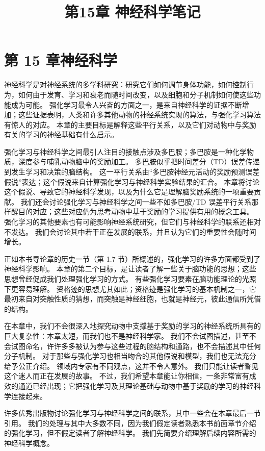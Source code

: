 \documentclass[UTF8,12pt,a4paper,fontset=fandol]{ctexart}
\title{第15章 神经科学笔记}
\author{}
\date{}
\begin{document}
\maketitle

\section*{第 15 章\quad 神经科学}

神经科学是对神经系统的多学科研究：研究它们如何调节身体功能，如何控制行为，如何由于发育、学习和衰老而随时间改变，以及细胞和分子机制如何使这些功能成为可能。
强化学习最令人兴奋的方面之一，是来自神经科学的证据不断增加；这些证据表明，人类和许多其他动物的神经系统实现的算法，与强化学习算法有惊人的对应。
本章的主要目标是解释这些平行关系，以及它们对动物中与奖励有关的学习的神经基础有什么启示。

强化学习与神经科学之间最引人注目的接触点涉及多巴胺；多巴胺是一种化学物质，深度参与哺乳动物脑中的奖励加工。
多巴胺似乎把时间差分（TD）误差传递到发生学习和决策的脑结构。
这一平行关系由“多巴胺神经元活动的奖励预测误差假说”表达；这个假说来自计算强化学习与神经科学实验结果的汇合。
本章将讨论这个假说、导致它的神经科学发现，以及为什么它是理解脑奖励系统的一项重要贡献。
我们还会讨论强化学习与神经科学之间一些不如多巴胺/TD 误差平行关系那样醒目的对应；这些对应仍为思考动物中基于奖励的学习提供有用的概念工具。
强化学习的其他要素也有可能影响神经系统研究，但它们与神经科学的联系还相对不发达。
我们会讨论其中若干正在发展的联系，并且认为它们的重要性会随时间增长。

正如本书导论章的历史一节（第 1.7 节）所概述的，强化学习的许多方面都受到了神经科学影响。
本章的第二个目标，是让读者了解一些关于脑功能的思想；这些思想曾经促成我们处理强化学习的方式。
有些强化学习要素在脑功能理论的光照下更容易理解。
资格迹的思想尤其如此；资格迹是强化学习的基本机制之一，它最初来自对突触性质的猜想，而突触是神经细胞，也就是神经元，彼此通信所凭借的结构。

在本章中，我们不会很深入地探究动物中支撑基于奖励的学习的神经系统所具有的巨大复杂性：本章太短，而我们也不是神经科学家。
我们不会试图描述，甚至不会试图命名，许许多多被认为参与这些过程的脑结构和通路，也不会描述其中任何分子机制。
对于那些与强化学习也相当吻合的其他假说和模型，我们也无法充分给予公正介绍。
领域内专家有不同观点，这并不令人意外。
我们只能让读者瞥见这个迷人而正在发展的故事。
不过，我们希望本章能让你相信，一条非常富有成效的通道已经出现；它把强化学习及其理论基础与动物中基于奖励的学习的神经科学连接起来。

许多优秀出版物讨论强化学习与神经科学之间的联系，其中一些会在本章最后一节引用。
我们的处理与其中大多数不同，因为我们假定读者熟悉本书前面章节介绍的强化学习，但不假定读者了解神经科学。
我们先简要介绍理解后续内容所需的神经科学概念。
\end{document}
